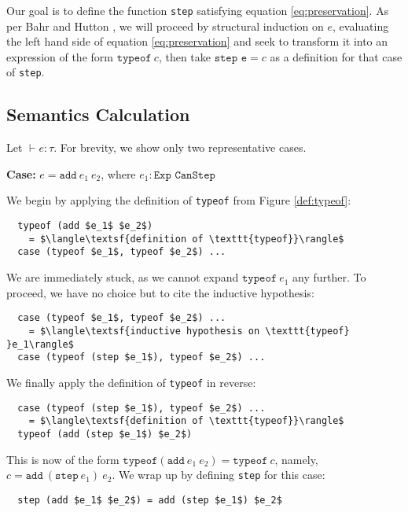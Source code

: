 \documentclass[manuscript,screen,review,sigplan]{acmart}
\begin{document}
Our goal is to define the function \texttt{step}
satisfying equation \ref{eq:preservation}. As per Bahr and Hutton
\cite{bahr:2015}, we will proceed by structural induction on $e$, evaluating
the left hand side of equation \ref{eq:preservation} and seek to transform it
into an expression of the form $\texttt{typeof}\ c$, then take $\texttt{step e}
= c$ as a definition for that case of \texttt{step}.

\subsection{Semantics Calculation}

Let $\vdash e : \tau$. For brevity, we show only two representative cases.

\hfill

\textbf{Case:} $e = \texttt{add}\ e_1\ e_2$, where $e_1 : \texttt{Exp CanStep}$

\hfill

We begin by applying the definition of \texttt{typeof} from Figure \ref{def:typeof}:

\begin{lstlisting}
  typeof (add $e_1$ $e_2$)
    = $\langle\textsf{definition of \texttt{typeof}}\rangle$
  case (typeof $e_1$, typeof $e_2$) ...
\end{lstlisting}

We are immediately stuck, as we cannot expand $\texttt{typeof}\ e_1$ any
further. To proceed, we have no choice but to cite the inductive hypothesis:

\begin{lstlisting}
  case (typeof $e_1$, typeof $e_2$) ...
    = $\langle\textsf{inductive hypothesis on \texttt{typeof} }e_1\rangle$
  case (typeof (step $e_1$), typeof $e_2$) ...
\end{lstlisting}

We finally apply the definition of \texttt{typeof} in reverse:

\begin{lstlisting}
  case (typeof (step $e_1$), typeof $e_2$) ...
    = $\langle\textsf{definition of \texttt{typeof}}\rangle$
  typeof (add (step $e_1$) $e_2$)
\end{lstlisting}

This is now of the form $\texttt{typeof} (\texttt{add}\ e_1\ e_2) = \texttt{typeof}\ c$,
namely, $c = \texttt{add}\ (\texttt{step}\ e_1)\ e_2$. We wrap up by defining
\texttt{step} for this case:

\begin{lstlisting}
  step (add $e_1$ $e_2$) = add (step $e_1$) $e_2$
\end{lstlisting}
\end{document}

